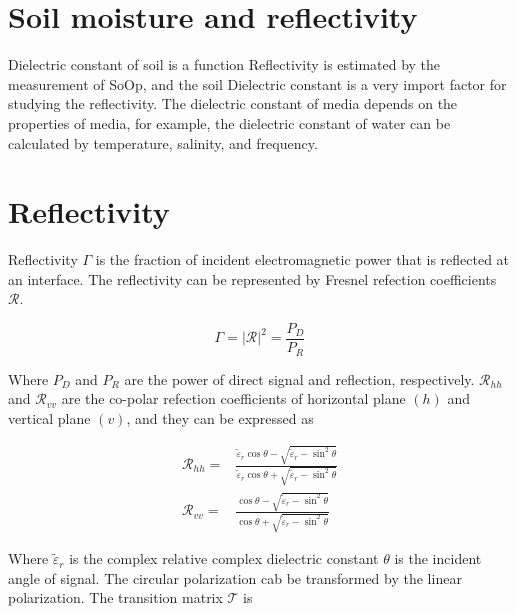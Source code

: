 \documentclass[draftcls,onecolumn]{IEEEtran}  %
\begin{document}
\section{Soil moisture and reflectivity}
Dielectric constant of soil is a function Reflectivity is estimated by the measurement of SoOp, and the soil Dielectric constant is a very import factor for studying the reflectivity. The dielectric constant of media depends on the properties of media, for example, the dielectric constant of water can be calculated by temperature, salinity, and frequency.
\section{Reflectivity}

Reflectivity $\Gamma$ is the fraction of incident electromagnetic power that is reflected at an interface. The reflectivity can be represented by Fresnel refection coefficients $\mathcal{R}$.

\begin{equation}
\Gamma = |\mathcal{R}|^2=\frac{P_D}{P_R}
\end{equation}

Where $P_D$ and $P_R$ are the power of direct signal and reflection, respectively. $\mathcal{R}_{hh}$ and $\mathcal{R}_{vv}$ are the co-polar refection coefficients of horizontal plane $(h)$ and vertical plane $(v)$, and they can be expressed as

\begin{equation} 
\begin{split}
	{\mathcal{R}_{hh}} = {}& \frac{{{{\tilde \varepsilon }_r}\cos \theta  - \sqrt 				{{{\tilde \varepsilon }_r} - {{\sin }^2}\theta } }}{{{{\tilde \varepsilon}_r}				\cos \theta  + \sqrt {{{\tilde \varepsilon }_r} - {{\sin }^2}\theta }}}
\\
	{\mathcal{R}_{vv}} = {}& \frac{{\cos \theta  - \sqrt {{{\tilde \varepsilon }_r} - {{\sin }^2}\theta } }}{{\cos \theta  + \sqrt {{{\tilde \varepsilon }_r} - {{\sin }^2}\theta }}} 
    \end{split}
     \label{Eq: reflectivity_di}
\end{equation}

Where $\tilde{\varepsilon}_r$ is the complex relative complex dielectric constant  $\theta$ is the incident angle of signal. The circular polarization cab be transformed by the linear polarization. The transition matrix $\mathcal{T}$ is
\end{document}
